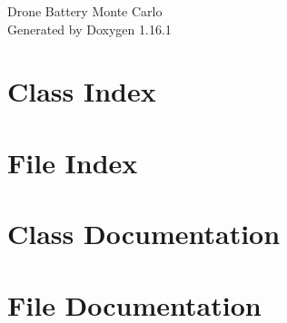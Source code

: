 \documentclass[twoside]{book}
\newcommand{\+}{\discretionary{\mbox{\scriptsize$\hookleftarrow$}}{}{}}
\newcommand{\clearemptydoublepage}{%
    \newpage{\pagestyle{empty}\cleardoublepage}%
  }
\begin{document}
  \raggedbottom
    \hypersetup{pageanchor=false,
                bookmarksnumbered=true,
                pdfencoding=unicode
               }
  \begin{titlepage}
  \vspace*{7cm}
  \begin{center}%
  {\Large Drone Battery Monte Carlo}\\
  \vspace*{1cm}
  {\large Generated by Doxygen 1.16.1}\\
  \end{center}
  \end{titlepage}
  \clearemptydoublepage
  \tableofcontents
  \clearemptydoublepage
  \hypersetup{pageanchor=true}
\chapter{Class Index}

\chapter{File Index}

\chapter{Class Documentation}



\chapter{File Documentation}

  \backmatter
  \newpage
  \clearemptydoublepage
  \printindex
\end{document}
